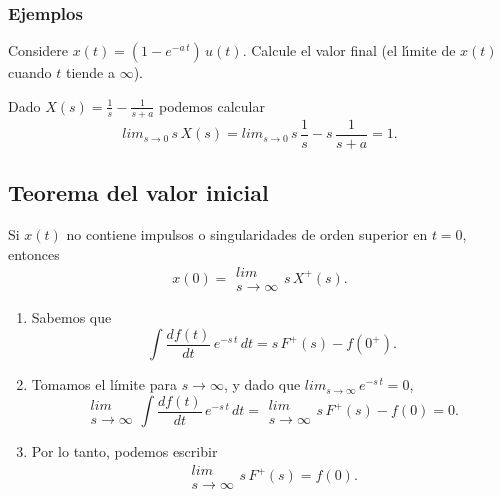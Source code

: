 \subsubsection{Ejemplos}

Considere $x(t) = (1 - e^{-a \, t}) \, u(t)$. Calcule el valor final (el l\'{\i}mite de $x(t)$ cuando $t$ tiende a $\infty$).

Dado $X(s) = \frac{1}{s} - \frac{1}{s + a}$ podemos calcular 
\begin{equation} 
lim_{s \rightarrow 0} \, s \, X(s) =  
lim_{s \rightarrow 0} \, s \, \frac{1}{s} - s \, \frac{1}{s + a} = 1. 
\end{equation}


\subsection{Teorema del valor inicial}

 Si $x(t)$ no contiene impulsos o singularidades de orden superior en $t=0$, entonces
 \begin{equation}
        x(0) = 
        \begin{array}{c}
                lim     \\
                s \rightarrow \infty
        \end{array}
        s   \,    X^{+}(s).
 \end{equation}

\begin{enumerate}
 \item Sabemos que
 \begin{equation}
  \int \frac{df(t)}{dt} \, e^{-s \, t} \, dt = 
  s \, F^{+}(s) - f(0^{+}).
 \end{equation}

 \item Tomamos el límite para $s \rightarrow \infty$, y dado que $lim_{s \rightarrow \infty} \, e^{-s \, t} = 0$,
  \begin{equation}
       \begin{array}{c}
                lim     \\
                s \rightarrow \infty
        \end{array}
  \int \frac{df(t)}{dt} \, e^{-s \, t} \, dt = 
        \begin{array}{c}
                lim     \\
                s \rightarrow \infty
        \end{array}
  s \, F^{+}(s) - f(0) = 0.
 \end{equation}

 \item Por lo tanto, podemos escribir
 \begin{equation}
        \begin{array}{c}
                lim     \\
                s \rightarrow \infty
        \end{array}
  s \, F^{+}(s) = f(0).
 \end{equation}
\end{enumerate}

